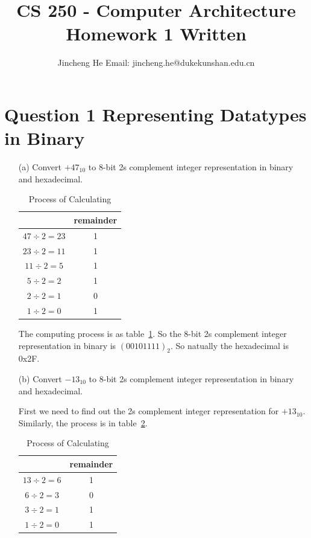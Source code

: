 \documentclass{article}
\title{CS 250 - Computer Architecture \\ Homework 1 Written}
\author{Jincheng He Email: jincheng.he@dukekunshan.edu.cn}
\theoremstyle{remark}
\theoremstyle{definition}
\begin{document}
    \maketitle


    \section{Question 1 Representing Datatypes in Binary}
    \begin{enumerate}
        \item[(a)] Convert $+47_{10}$ to 8-bit 2s complement integer representation in binary and hexadecimal.

        \begin{table}[!htbp]
            \centering
            \label{tab:q1_a}
            \begin{tabular}{cc}
                \toprule
                & remainder \\
                \midrule
                $47\div 2 = 23$ & 1         \\
                $23\div 2 = 11$ & 1         \\
                $11\div 2 = 5$  & 1         \\
                $5\div 2 = 2$   & 1         \\
                $2\div 2 = 1$   & 0         \\
                $1\div 2 = 0$   & 1         \\
                \bottomrule
            \end{tabular}
            \caption{Process of Calculating}
        \end{table}

        The computing process is as table~\ref{tab:q1_a}. So the 8-bit 2s complement integer representation in binary is $\left( 00101111 \right)_2$. So natually the hexadecimal is 0x2F.
        \item[(b)] Convert $-13_{10}$ to 8-bit 2s complement integer representation in binary and hexadecimal.

        First we need to find out the 2s complement integer representation for $+13_{10}$. Similarly, the process is in table~\ref{tab:q1_b}.
        \begin{table}[!htbp]
            \centering
            \label{tab:q1_b}
            \begin{tabular}{cc}
                \toprule
                & remainder \\
                \midrule
                $13\div 2 = 6$ & 1         \\
                $6\div 2 = 3$  & 0         \\
                $3\div 2 = 1$  & 1         \\
                $1\div 2 = 0$  & 1         \\
                \bottomrule
            \end{tabular}
            \caption{Process of Calculating}
        \end{table}


\end{enumerate}
\end{document}
